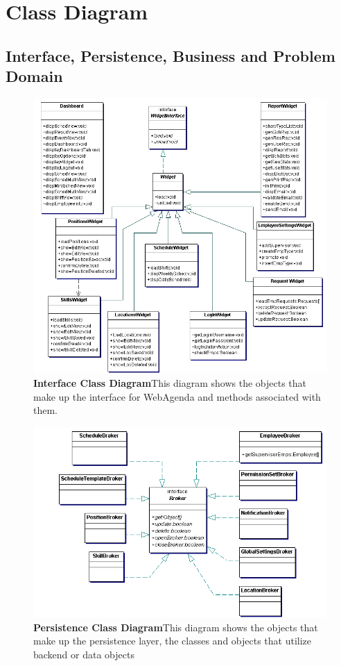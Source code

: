 \documentclass[letterpaper,12pt]{report}
\begin{document}
\chapter{Class Diagram}
\section{Interface, Persistence, Business and Problem Domain}
\newpage

\begin{figure}[interfaceClassDia]
 \centering
 \includegraphics[scale=0.8]{externals/InterfaceClassDiagram.png}
 \caption{\small
\textbf{Interface Class Diagram}\newline This diagram shows the objects that make up the interface for WebAgenda and methods associated with them. }\label{fig:intclassdia}
\end{figure}
\newpage
\begin{figure}[persistdomainClassDia]
 \centering
 \includegraphics[scale=0.8]{externals/PersistenceClassDiagram.png}
 \caption{\small
\textbf{Persistence Class Diagram}\newline This diagram shows the objects that make up the persistence layer, the classes and objects that utilize backend or data objects}\label{fig:persclassdia}
\end{figure}
\end{document}
